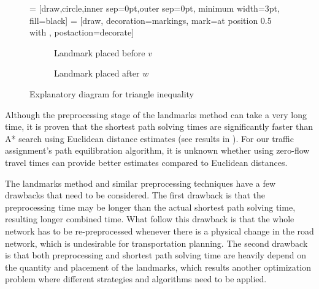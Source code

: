 \begin{figure}[H]
    \centering
     = [draw,circle,inner sep=0pt,outer sep=0pt, minimum width=3pt, fill=black]
     = [draw, decoration={markings, mark=at position 0.5 with {\arrow{>}}}, postaction={decorate}]
    \begin{subfigure}[t]{.4\textwidth}
        \centering
        \caption{Landmark placed before $v$}
    \end{subfigure}
    \hspace{1cm}
    \begin{subfigure}[t]{.4\textwidth}
        \centering
        \caption{Landmark placed after $w$}
    \end{subfigure}
    \caption{Explanatory diagram for triangle inequality}
    \label{fig:landmarks}
\end{figure}

Although the preprocessing stage of the landmarks method can take a very long time,
it is proven that the shortest path solving times are significantly faster than A* search using Euclidean distance estimates (see results in \citet{GoldbergLandmarks}).
For our traffic assignment's path equilibration algorithm,
it is unknown whether using zero-flow travel times can provide better estimates compared to Euclidean distances.

The landmarks method and similar preprocessing techniques have a few drawbacks that need to be considered.
The first drawback is that the preprocessing time may be longer than the actual shortest path solving time, resulting longer combined time.
What follow this drawback is that the whole network has to be re-preprocessed whenever there is a physical change in the road network,
which is undesirable for transportation planning.
The second drawback is that both preprocessing and shortest path solving time are heavily depend on the quantity and placement of the landmarks,
which results another optimization problem where different strategies and algorithms need to be applied.

